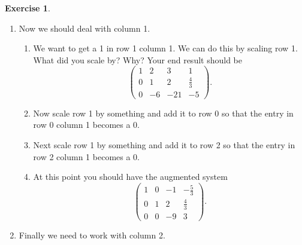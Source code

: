 \documentclass[
]{book}
\providecommand{\tightlist}{%
  \setlength{\itemsep}{0pt}\setlength{\parskip}{0pt}}
\theoremstyle{definition}
\theoremstyle{definition}
\theoremstyle{definition}
\newtheorem{exercise}{Exercise}[chapter]
\theoremstyle{remark}
\begin{document}
\begin{exercise}
\begin{enumerate}
  \begin{enumerate}
  \def\labelenumii{\roman{enumii}.}
  \tightlist
  \item
    For example, if we multiply the \(0^{th}\) row by \(-4\) and add it to the first row we get
    \[ \left( \begin{array}{ccc|c} 1 & 2 & 3 & 1 \\ 0 & -3 & -6 & -4 \\ 7 & 8 & 0 & 2 \end{array} \right). \]
  \item
    Multiply row 0 by a scalar and add it to row 2. Your end result should be
    \[ \left( \begin{array}{ccc|c} 1 & 2 & 3 & 1 \\ 0 & -3 & -6 & -4 \\ 0 & -6 & -21 & -5 \end{array} \right). \]
    What did you multiply by? Why?
  \end{enumerate}
\item
  Now we should deal with column 1.

  \begin{enumerate}
  \def\labelenumii{\roman{enumii}.}
  \tightlist
  \item
    We want to get a 1 in row 1 column 1. We can do this by scaling row 1. What did you scale by? Why? Your end result should be
    \[ \left( \begin{array}{ccc|c} 1 & 2 & 3 & 1 \\ 0 & 1 & 2 & \frac{4}{3} \\ 0 & -6 & -21 & -5 \end{array} \right). \]
  \item
    Now scale row 1 by something and add it to row 0 so that the entry in row 0 column 1 becomes a 0.\\
  \item
    Next scale row 1 by something and add it to row 2 so that the entry in row 2 column 1 becomes a 0.\\
  \item
    At this point you should have the augmented system
    \[ \left( \begin{array}{ccc|c} 1 & 0 & -1 & -\frac{5}{3} \\ 0 & 1 & 2 & \frac{4}{3} \\ 0 & 0 & -9 & 3 \end{array} \right). \]
  \end{enumerate}
\item
  Finally we need to work with column 2.


\end{enumerate}
\end{exercise}
\end{document}
